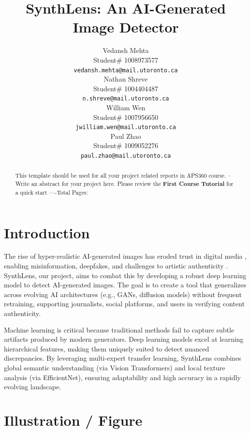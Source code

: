 \documentclass{article} %
\title{SynthLens: An AI-Generated Image Detector}
\author{Vedansh Mehta  \\
Student\# 1008973577 \\
\texttt{vedansh.mehta@mail.utoronto.ca} \\
\And
Nathan Shreve  \\
Student\# 1004404487 \\
\texttt{n.shreve@mail.utoronto.ca} \\
\AND
William Wen  \\
Student\# 1007956650 \\
\texttt{jwilliam.wen@mail.utoronto.ca} \\
\And
Paul Zhao \\
Student\# 1009052276 \\
\texttt{paul.zhao@mail.utoronto.ca} \\
\AND
}
\begin{document}
\maketitle

\begin{abstract}
    This template should be used for all your project related reports in APS360 course. -- Write an abstract for your project here. Please review the \textbf{ First Course Tutorial} for a quick start
    ----Total Pages: \pageref{last_page}
\end{abstract}



\section{Introduction}
The rise of hyper-realistic AI-generated images has eroded trust in digital media \citep{digitalcontent2024trust}, enabling misinformation, deepfakes, and challenges to artistic authenticity \citep{Guardian2023}. SynthLens, our project, aims to combat this by developing a robust deep learning model to detect AI-generated images. The goal is to create a tool that generalizes across evolving AI architectures (e.g., GANs, diffusion models) without frequent retraining, supporting journalists, social platforms, and users in verifying content authenticity.

Machine learning is critical because traditional methods fail to capture subtle artifacts produced by modern generators. Deep learning models excel at learning hierarchical features, making them uniquely suited to detect nuanced discrepancies. By leveraging multi-expert transfer learning, SynthLens combines global semantic understanding (via Vision Transformers) and local texture analysis (via EfficientNet), ensuring adaptability and high accuracy in a rapidly evolving landscape.

\section{Illustration / Figure}
\end{document}
